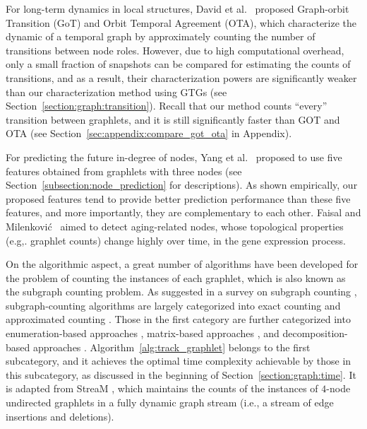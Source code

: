 For long-term dynamics in local structures,
David et al.~\cite{aparicio2018graphlet} proposed Graph-orbit Transition (GoT) and Orbit Temporal Agreement (OTA), which characterize the dynamic of a temporal graph by approximately counting the number of transitions between node roles.
However, due to high computational overhead, only a small fraction of snapshots can be compared for estimating the counts of transitions, and as a result, their  characterization powers are significantly weaker than our characterization method using GTGs (see Section~\ref{section:graph:transition}). Recall that our method counts ``every'' transition between graphlets, and it is still significantly faster than GOT and OTA (see Section~\ref{sec:appendix:compare_got_ota} in Appendix).


For predicting the future in-degree of nodes, Yang et al.~\cite{yang2014predicting} proposed to use five features obtained from graphlets with three nodes (see Section~\ref{subsection:node_prediction} for descriptions).
As shown empirically, our proposed features tend to provide better prediction performance than these five features, and more importantly, they are complementary to each other.
Faisal and Milenkovi{\'c}~\cite{faisal2014dynamic} aimed to detect aging-related nodes, whose topological properties (e.g,. graphlet counts) change highly over time, in the gene expression process. 

On the algorithmic aspect, a great number of algorithms have been developed for the problem of counting the instances of each graphlet, which is also known as the subgraph counting problem. %
As suggested in a survey on subgraph counting \cite{ribeiro2021survey},  subgraph-counting algorithms are largely categorized into exact counting \cite{milo2002network, schiller2015stream, ortmann2017efficient, ahmed2017graphlet} and approximated counting  \cite{wernicke2005faster, aslay2018mining}.
Those in the first category are further categorized into enumeration-based approaches \cite{milo2002network, schiller2015stream}, matrix-based approaches \cite{ortmann2017efficient}, and decomposition-based approaches \cite{ahmed2017graphlet}. 
Algorithm~\ref{alg:track_graphlet} belongs to the first subcategory, and it achieves the optimal time complexity achievable by those in this subcategory, as discussed in the beginning of Section~\ref{section:graph:time}.
It is adapted from StreaM \cite{schiller2015stream}, which maintains the counts of the instances of $4$-node undirected graphlets in a fully dynamic graph stream (i.e., a stream of edge insertions and deletions). %


